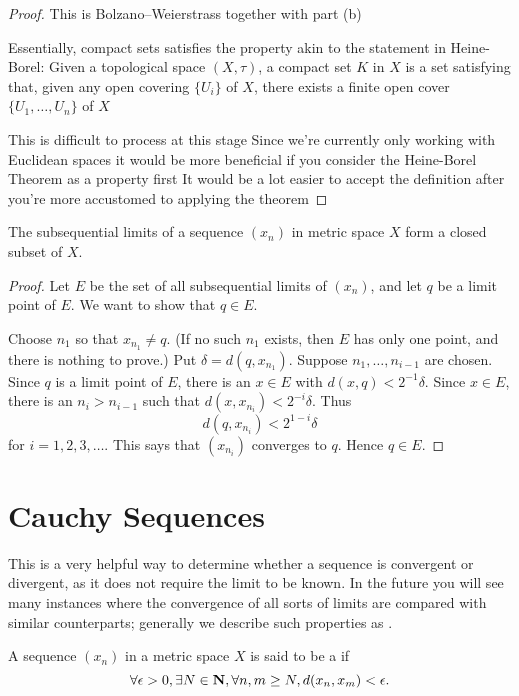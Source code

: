 \begin{proof}
This is Bolzano--Weierstrass together with part (b)

Essentially, compact sets satisfies the property akin to the statement in Heine-Borel:
Given a topological space $(X,\tau)$, a compact set $K$ in $X$ is a set satisfying that, given any open covering $\{U_i\}$ of $X$, there exists a finite open cover $\{U_1,\dots,U_n\}$ of $X$

This is difficult to process at this stage
Since we're currently only working with Euclidean spaces it would be more beneficial if you consider the Heine-Borel Theorem as a property first
It would be a lot easier to accept the definition after you're more accustomed to applying the theorem
\end{proof}

\begin{proposition}
The subsequential limits of a sequence $(x_n)$ in metric space $X$ form a closed subset of $X$.
\end{proposition}

\begin{proof}
Let $E$ be the set of all subsequential limits of $(x_n)$, and let $q$ be a limit point of $E$. We want to show that $q\in E$.

Choose $n_1$ so that $x_{n_1}\neq q$. (If no such $n_1$ exists, then $E$ has only one point, and there is nothing to prove.) Put $\delta=d(q,x_{n_1})$. Suppose $n_1,\dots,n_{i-1}$ are chosen. Since $q$ is a limit point of $E$, there is an $x\in E$ with $d(x,q)<2^{-1}\delta$. Since $x\in E$, there is an $n_i>n_{i-1}$ such that $d(x,x_{n_i})<2^{-i}\delta$. Thus
\[d(q,x_{n_i})<2^{1-i}\delta\]
for $i=1,2,3,\dots$. This says that $(x_{n_i})$ converges to $q$. Hence $q\in E$.
\end{proof}

\section{Cauchy Sequences}
This is a very helpful way to determine whether a sequence is convergent or divergent, as it does not require the limit to be known. In the future you will see many instances where the convergence of all sorts of limits are compared with similar counterparts; generally we describe such properties as .

\begin{definition}
A sequence $(x_n)$ in a metric space $X$ is said to be a  if 
\[\forall\epsilon>0,\exists N\in\mathbf N,\forall n,m\ge N,d(x_n,x_m)<\epsilon.\]
\end{definition}

